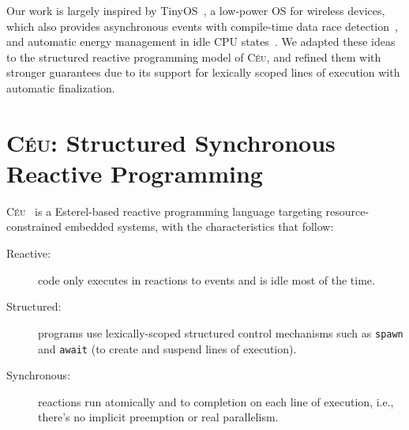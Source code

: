 \documentclass[sigplan,10pt,review,anonymous]{acmart}\settopmatter{printfolios=true,printccs=false,printacmref=false}
\newcommand{\CEU}{\textsc{C\'{e}u}\xspace}
\newcommand{\code}[1] {{\small{\texttt{#1}}}}
\begin{document}
Our work is largely inspired by TinyOS~\cite{wsn.tos}, a low-power OS for
wireless devices, which also provides asynchronous events with compile-time
data race detection~\cite{wsn.nesc}, and automatic energy management
in idle CPU states~\cite{wsn.icem}.
%
We adapted these ideas to the structured reactive programming model of \CEU,
and refined them with stronger guarantees due to its support for lexically
scoped lines of execution with automatic finalization.

\section{\CEU: Structured Synchronous Reactive Programming}
\label{sec.ceu}

\CEU~\cite{ceu.sensys13} is a Esterel-based
reactive
programming language targeting resource-constrained embedded systems, with the
characteristics that follow:
%
\begin{description}
\item [Reactive:] code only executes in reactions to events and is idle most of
    the time.
\item [Structured:] programs use lexically-scoped structured control
    mechanisms such as \code{spawn} and \code{await} (to create and suspend
    lines of execution).
\item [Synchronous:] reactions run atomically and to completion on each line of
    execution, i.e., there's no implicit preemption or real parallelism.
\end{description}
\end{document}
